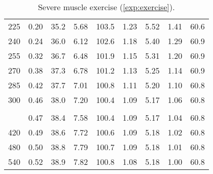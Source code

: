 \begin{table}
\begin{tabular}{ccccccccc}
    225 & 0.20 & 35.2 & 5.68 & 103.5 & 1.23 & 5.52 & 1.41 & 60.6 \\
    240 & 0.24 & 36.0 & 6.12 & 102.6 & 1.18 & 5.40 & 1.29 & 60.9 \\
    255 & 0.32 & 36.7 & 6.48 & 101.9 & 1.15 & 5.31 & 1.20 & 60.9 \\
    270 & 0.38 & 37.3 & 6.78 & 101.2 & 1.13 & 5.25 & 1.14 & 60.9 \\
    285 & 0.42 & 37.7 & 7.01 & 100.8 & 1.11 & 5.20 & 1.10 & 60.8 \\
    300 & 0.46 & 38.0 & 7.20 & 100.4 & 1.09 & 5.17 & 1.06 & 60.8 \\
    \addlinespace[\paramchangeskip]
    \multicolumn{9}{c}{\textit{I3 = 20}} \\
    \addlinespace[\paramchangeskip]
    360 & 0.47 & 38.4 & 7.58 & 100.4 & 1.09 & 5.17 & 1.04 & 60.8 \\
    420 & 0.49 & 38.6 & 7.72 & 100.6 & 1.09 & 5.18 & 1.02 & 60.8 \\
    480 & 0.50 & 38.8 & 7.79 & 100.7 & 1.09 & 5.18 & 1.01 & 60.8 \\
    540 & 0.52 & 38.9 & 7.82 & 100.8 & 1.08 & 5.18 & 1.00 & 60.8 \\
    \bottomrule
  \end{tabular}
  \caption{Severe muscle exercise (\autoref{exp:exercise}).}
  \label{tbl:exercise}
\end{table}
